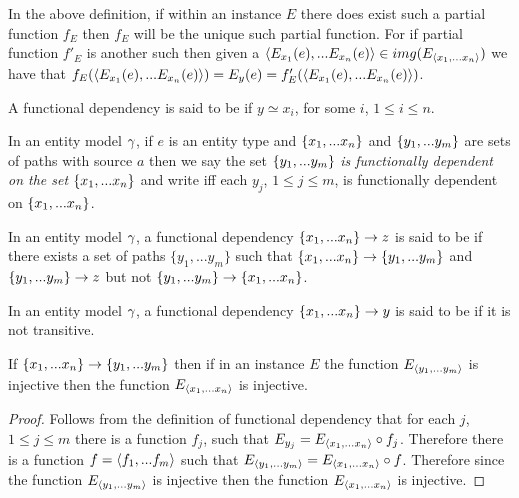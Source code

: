 \begin{remark}
In the above definition, if within an instance $E$ there does exist such a partial function $f_E$ then $f_E$ will be the unique such partial function. For if partial function $f'_E$ is another such then given a $\langle E_{x_1}(e),...E_{x_n}(e)\rangle \in img(E_{\langle x_1,...x_n\rangle})$
we have that $f_E(\langle E_{x_1}(e),...E_{x_n}(e)\rangle)=E_y(e)=f'_E(\langle E_{x_1}(e),...E_{x_n}(e)\rangle)$.
\end{remark}

\begin{definition}
A functional dependency  is said to be  if $y\simeq x_i$, for some $i$, $1 \leq i \leq n$.
\end{definition}

\begin{definition}
In an entity model $\gamma$, if
$e$ is an entity type and $\left\{x_1,...x_n\right\}$ and $\left\{y_1,...y_m\right\}$ are sets of paths with source $a$
then we say the set $\left\{y_1,...y_m\right\}$ \textit{is functionally dependent on the set} $\left\{x_1,...x_n\right\}$ and write
iff  each $y_j$, $1 \leq j \leq m$, is functionally dependent on $\left\{x_1,...x_n\right\}$.
\end{definition}
\begin{definition} %
In an entity model $\gamma$, a functional dependency $\left\{x_1,...x_n\right\} \rightarrow z$
is said to be  if there exists a set of paths $\{y_1,...y_{m}\}$ such that
$\left\{x_1,...x_n\right\} \rightarrow \left\{y_1,...y_{m}\right\}$ and $\left\{y_1,...y_{m}\right\} \rightarrow z$ but not
$\{y_1,...y_{m}\} \rightarrow \{x_1,...x_n\}$.
\end{definition}
\begin{definition} %
In an entity model $\gamma$, a functional dependency $\left\{x_1,...x_n\right\} \rightarrow y$
is said to be  if it is not transitive.
\end{definition}
\begin{lemma}
\label{transitiveinjectivelemma}
If $\left\{x_1,...x_n\right\} \rightarrow \left\{y_1,...y_{m}\right\}$ then if in an instance $E$ the function $E_{\langle y_1,...y_{m}\rangle}$ is 
injective then the function $E_{\langle x_1,...x_n\rangle}$  is injective. 
\end{lemma}
\begin{proof}
Follows from the definition of functional dependency that for each $j$, $1 \leq j \leq m$  there is a function ${f_j}$,  such that
$E_{y_j}=E_{\langle x_1,...x_n\rangle}\circ f_j$. Therefore there is a function $f=\langle f_1,...f_m\rangle$ such that
$E_{\langle y_1,...y_m\rangle}= E_{\langle x_1,...x_n\rangle}\circ f $. Therefore since  the function $E_{\langle y_1,...y_{m}\rangle}$ is 
injective then the function $E_{\langle x_1,...x_n\rangle}$  is injective.
\end{proof}

